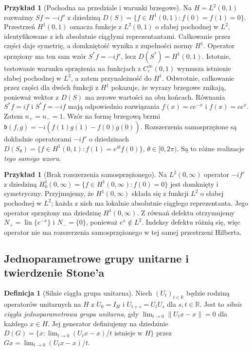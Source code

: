 \documentclass[11pt,a4paper]{article}
\numberwithin{equation}{section}
\theoremstyle{plain}
\theoremstyle{definition}
\newtheorem{definicja}[twierdzenie]{Definicja}
\newtheorem{przyklad}[twierdzenie]{Przykład}
\theoremstyle{remark}
\newcommand{\R}{\mathbb R}
\DeclareMathOperator{\lin}{lin}
\begin{document}
\begin{przyklad}[Pochodna na przedziale i warunki brzegowe]
\label{ex:momentum-interval33}
Na $H=L^2(0,1)$ rozważmy
$Sf=-if'$ z dziedziną
$D(S)=\{f\in H^1(0,1):f(0)=f(1)=0\}$.
Przestrzeń $H^1(0,1)$ oznacza funkcje z $L^2(0,1)$
o słabej pochodnej w $L^2$, identyfikowane z ich
absolutnie ciągłymi reprezentantami.
Całkowanie przez części daje symetrię, a domkniętość
wynika z zupełności normy $H^1$.
Operator sprzężony ma ten sam wzór $S^*f=-if'$, lecz
$D(S^*)=H^1(0,1)$. Istotnie, testowanie warunku
sprzężenia na funkcjach z $C_c^\infty(0,1)$ wymusza istnienie
słabej pochodnej w $L^2$, a zatem przynależność do $H^1$.
Odwrotnie, całkowanie przez części dla dwóch funkcji z $H^1$
pokazuje, że wyrazy brzegowe znikają, ponieważ
wektor z $D(S)$ ma zerowe wartości na obu końcach.
Równania $S^*f=if$ i $S^*f=-if$ mają odpowiednio
rozwiązania $f(x)=ce^{-x}$ i $f(x)=ce^x$.
Zatem $n_+=n_-=1$. Wzór na formę brzegową brzmi
$\mathfrak b(f,g)=-i(f(1)\overline{g(1)}-f(0)\overline{g(0)})$.
Rozszerzenia samosprzężone są dokładnie operatorami
$-if'$ o dziedzinach
$D(S_\theta)=\{f\in H^1(0,1):f(1)=e^{i\theta}f(0)\}$,
$\theta\in[0,2\pi)$. Są to różne realizacje \emph{tego samego wzoru}.
\end{przyklad}

\begin{przyklad}[Brak rozszerzenia samosprzężonego]
Na $L^2(0,\infty)$ operator $-if'$ z dziedziną
$H_0^1(0,\infty)=\{f\in H^1(0,\infty):f(0)=0\}$
jest domknięty i symetryczny. Przyjmujemy, że $H^1(0,\infty)$
składa się z funkcji $L^2$ o słabej pochodnej w $L^2$;
każda z nich ma lokalnie absolutnie ciągłego reprezentanta. Jego operator sprzężony ma
dziedzinę $H^1(0,\infty)$. Z równań defektu otrzymujemy
$N_+=\lin\{e^{-x}\}$ i $N_- =\{0\}$, ponieważ $e^x\notin L^2$.
Indeksy defektu różnią się, więc operator nie ma rozszerzenia
samosprzężonego w tej samej przestrzeni Hilberta.
\end{przyklad}

\subsection{Jednoparametrowe grupy unitarne i twierdzenie Stone'a}

\begin{definicja}[Silnie ciągła grupa unitarna]
Niech $(U_t)_{t\in\R}$ będzie rodziną operatorów unitarnych
na $H$ z $U_0=I_H$ i $U_{t+s}=U_tU_s$ dla $s,t\in\R$.
Jest to \emph{silnie ciągła jednoparametrowa grupa unitarna}, gdy
$\lim_{t\to0}\|U_tx-x\|=0$ dla każdego $x\in H$.
Jej generator definiujemy na dziedzinie
$D(G)=\{x:\lim_{t\to0}(U_tx-x)/t\text{ istnieje w }H\}$
przez $Gx=\lim_{t\to0}(U_tx-x)/t$.
\end{definicja}
\end{document}
